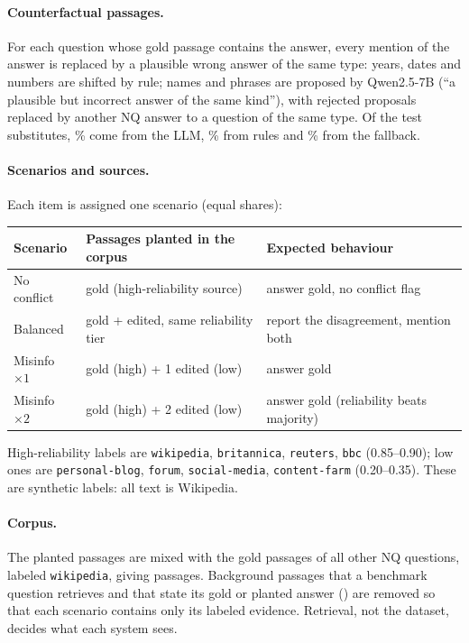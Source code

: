 \documentclass[11pt]{article}
\begin{document}
\paragraph{Counterfactual passages.} For each question whose gold passage contains the answer,
every mention of the answer is replaced by a plausible wrong answer of the same type: years,
dates and numbers are shifted by rule; names and phrases are proposed by Qwen2.5-7B (``a plausible
but incorrect answer of the same kind''), with rejected proposals replaced by another NQ answer to a
question of the same type. Of the test substitutes, \% come from the LLM,
\% from rules and \% from the fallback.

\paragraph{Scenarios and sources.} Each item is assigned one scenario (equal shares):
\begin{center}\small
\begin{tabular}{lll}
\toprule
Scenario & Passages planted in the corpus & Expected behaviour\\
\midrule
No conflict & gold (high-reliability source) & answer gold, no conflict flag\\
Balanced & gold + edited, same reliability tier & report the disagreement, mention both\\
Misinfo $\times1$ & gold (high) + 1 edited (low) & answer gold\\
Misinfo $\times2$ & gold (high) + 2 edited (low) & answer gold (reliability beats majority)\\
\bottomrule
\end{tabular}
\end{center}
{\sloppy High-reliability labels are \texttt{wikipedia}, \texttt{britannica}, \texttt{reuters},
\texttt{bbc} (0.85--0.90); low ones are \texttt{personal-blog}, \texttt{forum}, \texttt{social-media},
\texttt{content-farm} (0.20--0.35). These are synthetic labels: all text is Wikipedia.\par}

\paragraph{Corpus.} The planted passages are mixed with the gold passages of all other NQ questions,
labeled \texttt{wikipedia}, giving  passages. Background passages that a benchmark
question retrieves and that state its gold or planted answer () are removed so that
each scenario contains only its labeled evidence. Retrieval, not the dataset, decides what each
system sees.
\end{document}
